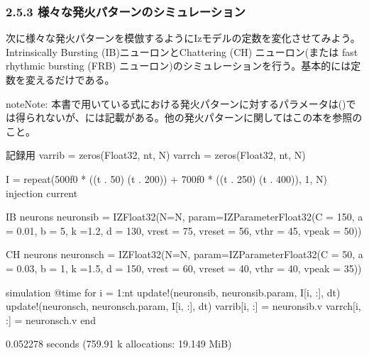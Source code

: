 \documentclass[letterpaper,10pt,english]{sphinxmanual}
\begin{document}
\subsubsection{2.5.3 様々な発火パターンのシミュレーション}
\label{\detokenize{2-5_iz:id7}}
次に様々な発火パターンを模倣するようにIzモデルの定数を変化させてみよう。Intrinsically Bursting (IB)ニューロンとChattering (CH) ニューロン(または fast rhythmic bursting (FRB) ニューロン)のシミュレーションを行う。基本的には定数を変えるだけである。

\begin{sphinxadmonition}{note}{Note:}
本書で用いている式における発火パターンに対するパラメータは()では得られないが、には記載がある。他の発火パターンに関してはこの本を参照のこと。
\end{sphinxadmonition}

\begin{sphinxVerbatim}[commandchars=\\\{\}]
\PYGZsh{} 記録用
varr\PYGZus{}ib = zeros(Float32, nt, N)
varr\PYGZus{}ch = zeros(Float32, nt, N)

I = repeat(500f0 * ((t .\PYGZgt{} 50) \PYGZhy{} (t .\PYGZgt{} 200)) + 700f0 * ((t .\PYGZgt{} 250) \PYGZhy{} (t .\PYGZgt{} 400)), 1, N)  \PYGZsh{} injection current

\PYGZsh{} IB neurons
neurons\PYGZus{}ib = IZ\PYGZob{}Float32\PYGZcb{}(N=N, 
    param=IZParameter\PYGZob{}Float32\PYGZcb{}(C = 150, a = 0.01, b = 5, k =1.2, d = 130, vrest = \PYGZhy{}75, vreset = \PYGZhy{}56, vthr = \PYGZhy{}45, vpeak = 50))

\PYGZsh{} CH neurons
neurons\PYGZus{}ch = IZ\PYGZob{}Float32\PYGZcb{}(N=N, 
    param=IZParameter\PYGZob{}Float32\PYGZcb{}(C = 50, a = 0.03, b = 1, k =1.5, d = 150, vrest = \PYGZhy{}60, vreset = \PYGZhy{}40, vthr = \PYGZhy{}40, vpeak = 35))

\PYGZsh{} simulation
@time for i = 1:nt
    update!(neurons\PYGZus{}ib, neurons\PYGZus{}ib.param, I[i, :], dt)
    update!(neurons\PYGZus{}ch, neurons\PYGZus{}ch.param, I[i, :], dt)
    varr\PYGZus{}ib[i, :] = neurons\PYGZus{}ib.v
    varr\PYGZus{}ch[i, :] = neurons\PYGZus{}ch.v
end
\end{sphinxVerbatim}

\begin{sphinxVerbatim}[commandchars=\\\{\}]
  0.052278 seconds (759.91 k allocations: 19.149 MiB)
\end{sphinxVerbatim}
\end{document}

